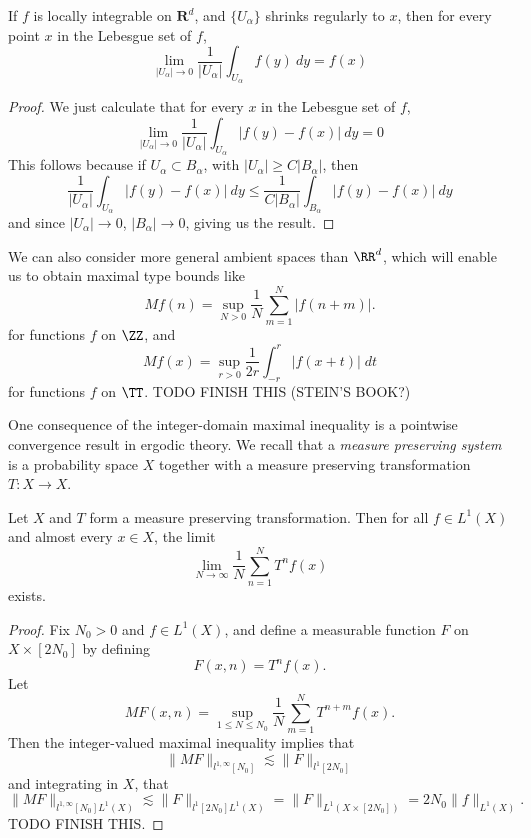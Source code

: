 \begin{theorem}
    If $f$ is locally integrable on $\mathbf{R}^d$, and $\{ U_\alpha \}$ shrinks regularly to $x$, then for every point $x$ in the Lebesgue set of $f$,
    \[ \lim_{|U_\alpha| \to 0} \frac{1}{|U_\alpha|} \int_{U_\alpha} f(y)\ dy = f(x) \]
\end{theorem}
\begin{proof}
    We just calculate that for every $x$ in the Lebesgue set of $f$,
    \[ \lim_{|U_\alpha| \to 0} \frac{1}{|U_\alpha|} \int_{U_\alpha} |f(y) - f(x)|\ dy = 0 \]
    This follows because if $U_\alpha \subset B_\alpha$, with $|U_\alpha| \geq C|B_\alpha|$, then
    \[ \frac{1}{|U_\alpha|} \int_{U_\alpha} |f(y) - f(x)|\ dy \leq \frac{1}{C|B_\alpha|} \int_{B_\alpha} |f(y) - f(x)|\ dy \]
    and since $|U_\alpha| \to 0$, $|B_\alpha| \to 0$, giving us the result.
\end{proof}

We can also consider more general ambient spaces than $\RR^d$, which will enable us to obtain maximal type bounds like
%
\[ Mf(n) = \sup_{N > 0} \frac{1}{N} \sum_{m = 1}^N |f(n + m)|. \]
%
for functions $f$ on $\ZZ$, and
%
\[ Mf(x) = \sup_{r > 0} \frac{1}{2r} \int_{-r}^r |f(x + t)|\; dt \]
%
for functions $f$ on $\TT$. TODO FINISH THIS (STEIN'S BOOK?)

One consequence of the integer-domain maximal inequality is a pointwise convergence result in ergodic theory. We recall that a \emph{measure preserving system} is a probability space $X$ together with a measure preserving transformation $T: X \to X$.

\begin{theorem}
  Let $X$ and $T$ form a measure preserving transformation. Then for all $f \in L^1(X)$ and almost every $x \in X$, the limit
  \[ \lim_{N \to \infty} \frac{1}{N} \sum_{n = 1}^N T^n f(x) \]
  exists.
\end{theorem}
\begin{proof}
  Fix $N_0 > 0$ and $f \in L^1(X)$, and define a measurable function $F$ on $X \times [2N_0]$ by defining
  \[ F(x,n) = T^n f(x). \]
  Let
  \[ MF(x,n) = \sup_{1 \leq N \leq N_0} \frac{1}{N} \sum_{m = 1}^N T^{n+m} f(x). \]
  Then the integer-valued maximal inequality implies that
  \[ \| MF \|_{l^{1,\infty}[N_0]} \lesssim \| F \|_{l^1[2N_0]} \]
  and integrating in $X$, that
  \[ \| MF \|_{l^{1,\infty}[N_0] L^1(X)} \lesssim \| F \|_{l^1[2N_0] L^1(X)} = \| F \|_{L^1(X \times [2N_0])} = 2N_0 \| f \|_{L^1(X)}. \]
  TODO FINISH THIS.
\end{proof}

